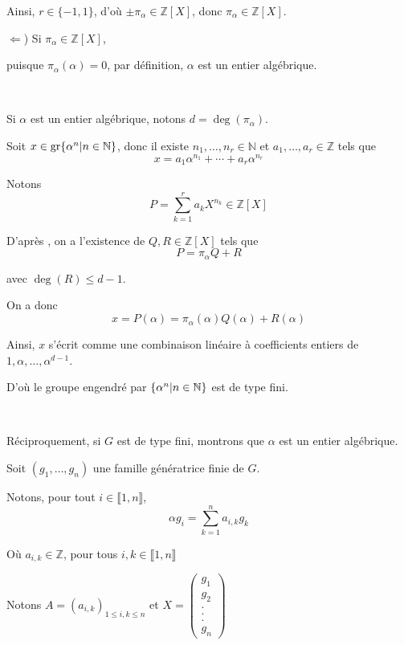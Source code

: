 Ainsi, $r \in \{ - 1, 1 \}$, d'o{\`u} $\pm \pi_{\alpha} \in \mathbb{Z} [X]$,
donc $\pi_{\alpha} \in \mathbb{Z} [X]$.

$\Leftarrow$) Si $\pi_{\alpha} \in \mathbb{Z} [X]$,

puisque $\pi_{\alpha} (\alpha) = 0$, par d{\'e}finition, $\alpha$ est un
entier alg{\'e}brique.

\

 Si $\alpha$ est un entier alg{\'e}brique, notons $d = \deg
(\pi_{\alpha})$.

Soit $x \in \operatorname{gr} \{ \alpha^n  |  n \in \mathbb{N} \}$, donc il
existe $n_1, \ldots, n_r \in \mathbb{N}$ et $a_1, \ldots, a_r \in \mathbb{Z}$
tels que
\[ x = a_1 \alpha^{n_1} + \cdots + a_r \alpha^{n_r} \]


Notons
\[ P = \underset{k = 1}{\overset{r}{\sum}} a_k X^{n_k} \in \mathbb{Z} [X] \]


D'apr{\`e}s , on a l'existence de $Q,
R \in \mathbb{Z} [X]$ tels que
\[ P = \pi_{\alpha} Q + R \]


avec $\deg (R) \leqslant d - 1$.

On a donc
\[ x = P (\alpha) = \pi_{\alpha} (\alpha) Q (\alpha) + R (\alpha) \]


Ainsi, $x$ s'{\'e}crit comme une combinaison lin{\'e}aire {\`a} coefficients
entiers de $1, \alpha, \ldots, \alpha^{d - 1}$.

D'o{\`u} le groupe engendr{\'e} par $\{ \alpha^n  |  n \in
\mathbb{N} \}$ est de type fini.

\

 R{\'e}ciproquement, si $G$ est de type fini, montrons que
$\alpha$ est un entier alg{\'e}brique.

Soit $(g_1, \ldots, g_n)$ une famille g{\'e}n{\'e}ratrice finie de $G$.

Notons, pour tout $i \in \llbracket 1, n \rrbracket$,
\[ \alpha g_i = \underset{k = 1}{\overset{n}{\sum}} a_{i, k} g_k \]


O{\`u} $a_{i, k} \in \mathbb{Z}$, pour tous $i, k \in \llbracket 1, n
\rrbracket$

Notons $A = (a_{i, k})_{1 \leqslant i, k \leqslant n}$ et $X = \left(
\begin{array}{c}
  g_1 \\
  g_2\\
  .\\
  .\\
  .\\
  g_n
\end{array} \right)$

